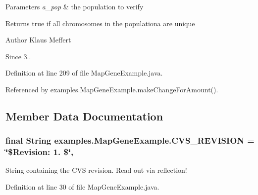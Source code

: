 \begin{DoxyParams}{Parameters}
{\em a\-\_\-pop} & the population to verify \\
\hline
\end{DoxyParams}
\begin{DoxyReturn}{Returns}
true if all chromosomes in the populationa are unique
\end{DoxyReturn}
\begin{DoxyAuthor}{Author}
Klaus Meffert 
\end{DoxyAuthor}
\begin{DoxySince}{Since}
3.. 
\end{DoxySince}


Definition at line 209 of file Map\-Gene\-Example.\-java.



Referenced by examples.\-Map\-Gene\-Example.\-make\-Change\-For\-Amount().



\subsection{Member Data Documentation}
\hypertarget{classexamples_1_1_map_gene_example_ab71e91c9712991e9009775da2ab9d09f}{
\subsubsection[{C\-V\-S\-\_\-\-R\-E\-V\-I\-S\-I\-O\-N}]{\setlength{\rightskip}{0pt plus 5cm}final String examples.\-Map\-Gene\-Example.\-C\-V\-S\-\_\-\-R\-E\-V\-I\-S\-I\-O\-N = \char`\"{}\$Revision\-: 1. \$\char`\"{}\hspace{0.3cm}{\ttfamily [static]}, {\ttfamily [private]}}}\label{classexamples_1_1_map_gene_example_ab71e91c9712991e9009775da2ab9d09f}
String containing the C\-V\-S revision. Read out via reflection! 

Definition at line 30 of file Map\-Gene\-Example.\-java.

